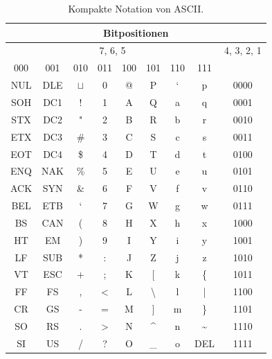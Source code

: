\begin{table}[htb]
\centering
\begin{tabular}{|c|c|c|c|c|c|c|c||c|}
\hline
\multicolumn{9}{|c|}{Bitpositionen} \\ \hline
\multicolumn{8}{|c||}{7, 6, 5} & 4, 3, 2, 1 \\ \hline \hline
000 & 001 & 010 & 011 & 100 & 101 & 110 & 111 & \\\hline 
NUL & DLE & $\sqcup$  & 0   & @   & P   &  `   &  p & 0000    \\ \hline 
SOH  & DC1   &  !   &  1   &  A   &  Q   &  a   &  q & 0001     \\ \hline 
STX   &  DC2    &   "   &   2  &  B   &  R   &  b   &  r & 0010     \\ \hline 
ETX   &  DC3    &  \#   &  3   &  C   &  S   &  c   &  s & 0011     \\ \hline 
EOT   & DC4    &  \$   &  4   &  D   &  T   &  d   &  t & 0100     \\ \hline 
ENQ  & NAK    &  \%   &  5   &  E   &  U   & e    & u & 0101      \\ \hline 
ACK  & SYN    & \&    &  6   &  F   &  V   &  f   &  v & 0110    \\ \hline 
BEL   & ETB   & ‘     &   7 &  G   &  W   &  g   &  w & 0111    \\ \hline 
BS   &  CAN   &  (    &  8   & H    & X    &  h   &  x & 1000    \\ \hline 
HT   &  EM   &  )   &  9   &  I   &  Y   &  i   &  y & 1001     \\ \hline 
LF   &  SUB   &  *   & :    &  J   &  Z   & j    & z & 1010     \\ \hline 
VT   &   ESC  &  +   & ;    &  K   &  [   & k    & \{ & 1011      \\ \hline 
FF   & FS    &  ,   & <    &  L   &  \textbackslash   &  l   &  | & 1100    \\ \hline 
CR   &  GS   &  -   & =    & M    &  ]   & m    &  \}  & 1101   \\ \hline 
SO   &  RS   &  .   &  >   &  N   &  \textasciicircum   &  n   &  \textasciitilde  & 1110   \\ \hline 
SI  &  US   &   /  &  ?   &  O   &  \_   & o    & DEL & 1111    \\ \hline
\end{tabular}
\caption{Kompakte Notation von \ac{ASCII}.}
\label{table-ascii-compact}
\end{table}

